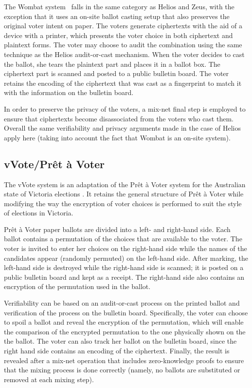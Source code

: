 The Wombat system~\cite{ben2012new} falls in the same category as
Helios and Zeus, with the exception that it uses an on-site ballot
casting setup that also preserves the original voter intent on paper.
The voters generate ciphertexts with the aid of a device with a
printer, which presents the voter choice in both ciphertext and
plaintext forms. The voter may choose to audit the combination using
the same technique as the Helios audit-or-cast mechanism. When the
voter decides to cast the ballot, she tears the plaintext part and
places it in a ballot box. The ciphertext part is scanned and posted
to a public bulletin board. The voter retains the encoding of the
ciphertext that was cast as a fingerprint to match it with the
information on the bulletin board.

In order to preserve the privacy of the voters, a mix-net final step
is employed to ensure that ciphertexts become disassociated from the
voters who cast them. Overall the same verifiability and privacy
arguments made in the case of Helios apply here (taking into account
the fact that Wombat is an on-site system).

\newcommand{\PaV}{Pr{\^{e}}t {\`{a}} Voter\xspace}

\subsection{vVote/\PaV}

The vVote system is an adaptation of the \PaV system for the
Australian state of Victoria elections \cite{culnane2014vvote}. It
retains the general structure of \PaV \cite{ryan2009} while modifying
the way the encryption of voter choices is performed to suit the style
of elections in Victoria.

\PaV paper ballots are divided into a left- and right-hand side. Each
ballot contains a permutation of the choices that are available to the
voter. The voter is invited to enter her choices on the right-hand
side while the names of the candidates appear (randomly permuted) on
the left-hand side. After marking, the left-hand side is destroyed
while the right-hand side is scanned; it is posted on a public
bulletin board and kept as a receipt. The right-hand side also
contains an encryption of the permutation used in the ballot.

Verifiability can be based on an audit-or-cast process on the printed
ballot and verification of the process on the bulletin board.
Specifically, the voter can choose to spoil a ballot and reveal the
encryption of the permutation, which will enable the comparison of the
encrypted permutation to the one physically shown on the the ballot.
The voter can also track her ballot on the bulletin board, since the
right hand side contains an encoding of the ciphertext. Finally, the
result is revealed after a mix-net operation that includes
zero-knowledge proofs to ensure that the mixing process is done
correctly (namely, no ballots are substituted or removed at each
mixing step).

